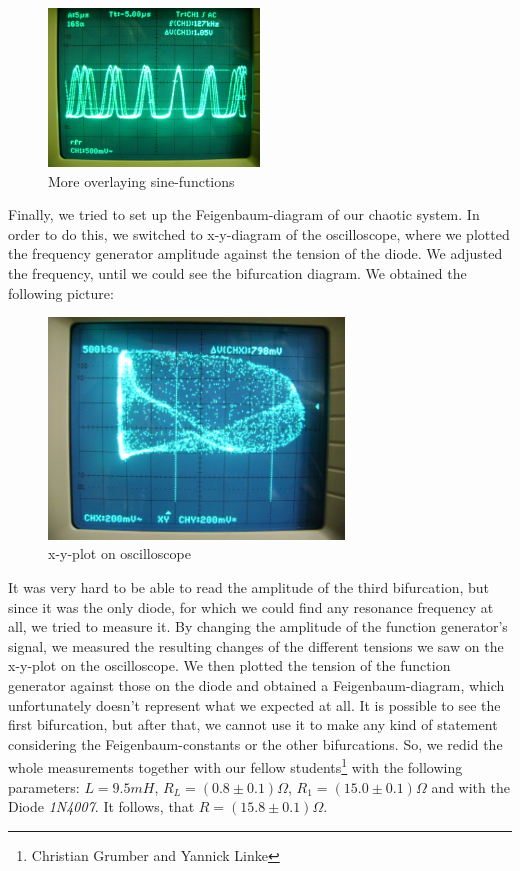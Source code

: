 \begin{figure}[H]
\centering \includegraphics[width=0.5\textwidth]{Fotos/03.jpg}
\caption{More overlaying sine-functions}
\end{figure}

Finally, we tried to set up the Feigenbaum-diagram of our chaotic system. In order to do this, we switched to x-y-diagram of the oscilloscope, where we plotted the frequency generator amplitude against the tension of the diode. We adjusted the frequency, until we could see the bifurcation diagram. We obtained the following picture:

\begin{figure}[H]
\centering \includegraphics[width= 0.7\textwidth]{Fotos/04.jpg}
\caption{x-y-plot on oscilloscope}
\end{figure}

It was very hard to be able to read the amplitude of the third bifurcation, but since it was the only diode, for which we could find any resonance frequency at all, we tried to measure it. By changing the amplitude of the function generator's signal, we measured the resulting changes of the different tensions we saw on the x-y-plot on the oscilloscope. We then plotted the tension of the function generator against those on the diode and obtained a Feigenbaum-diagram, which unfortunately doesn't represent what we expected at all. It is possible to see the first bifurcation, but after that, we cannot use it to make any kind of statement considering the Feigenbaum-constants or the other bifurcations.
So, we redid the whole measurements together with our fellow students\footnote{Christian Grumber and Yannick Linke} with the following parameters: $L = 9.5 mH$, $R_L=(0.8\pm 0.1)\Omega$, $R_1=(15.0 \pm 0.1) \Omega$ and with the Diode \emph{1N4007}. It follows, that $R = (15.8 \pm 0.1) \Omega$.

